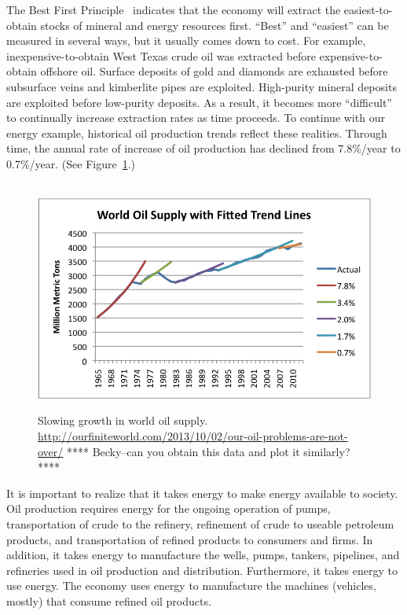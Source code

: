 The Best First Principle~\cite{Cleveland:2008aa}
indicates that the economy will extract the easiest-to-obtain 
stocks of mineral and energy resources first.
``Best'' and ``easiest'' can be measured in several ways, 
but it usually comes down to cost.
For example, inexpensive-to-obtain West Texas crude oil was extracted
before expensive-to-obtain offshore oil. 
Surface deposits of gold and diamonds are exhausted before subsurface
veins and kimberlite pipes are exploited.
High-purity mineral deposits are exploited before low-purity deposits.
As a result, it becomes more ``difficult'' to continually increase
extraction rates as time proceeds.
To continue with our energy example,
historical oil production trends reflect these realities.
Through time, the annual rate of increase of oil production
has declined from 7.8\%/year to 0.7\%/year.
(See Figure~\ref{fig:oil_production}.)

\begin{figure}[!ht]
\centering\
\includegraphics[width=\linewidth]{Part_0/Chapter_Introduction/images/growth-in-world-oil-supply.png}
\caption[World Oil Supply]{Slowing growth in world oil supply.
\url{http://ourfiniteworld.com/2013/10/02/our-oil-problems-are-not-over/}
**** Becky--can you obtain this data and plot it similarly? ****
}
\label{fig:oil_production}
\end{figure}

It is important to realize that it takes energy to make energy available to society.
Oil production requires energy for the ongoing
operation of pumps, 
transportation of crude to the refinery,
refinement of crude to useable petroleum products, and 
transportation of refined products to consumers and firms.
In addition, it takes energy to manufacture the wells, pumps, 
tankers, pipelines, and
refineries used in oil production and distribution.
Furthermore, it takes energy to use energy. 
The economy uses energy to manufacture the machines (vehicles, mostly)
that consume refined oil products.

